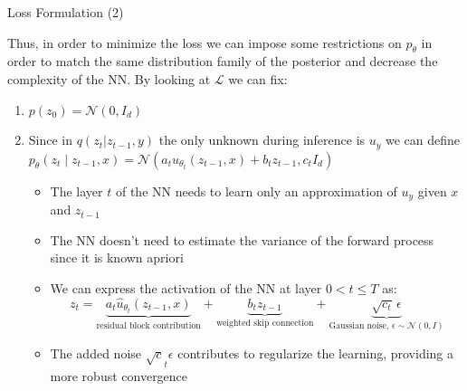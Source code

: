 \documentclass{beamer}
\begin{document}
\begin{frame}{Loss Formulation (2)}

Thus, in order to minimize the loss we can impose some restrictions on $p_\theta$ in order to match the same distribution family of the posterior and decrease the complexity of the NN. By looking at $\mathcal{L}$ we can fix:

\begin{enumerate}

\item $p(z_0) = \mathcal{N}(0, I_d)$
\item Since in $q(z_t | z_{t-1}, y)$ the only unknown during inference is $u_y$ we can define $p_\theta(z_t\mid z_{t-1}, x) = \mathcal{N}(a_t\hat u_{\theta _t}(z_{t-1}, x) + b_tz_{t-1} , c_tI_d)$

\medskip


\begin{itemize}

        \item The layer $t$ of the NN needs to learn only an approximation of $u_y$ given $x$ and $z_{t-1}$
        \item The NN doesn't need to estimate the variance of the forward process since it is known apriori
        \item We can express the activation of the NN at layer $0 < t \le T$ as:
        \[
        z_t = 
        \underbrace{a_t \hat u_{\theta _t}(z_{t-1}, x)}_{\text{residual block contribution}} +
        \underbrace{b_t z_{t-1}}_{\text{weighted skip connection}} +
        \underbrace{\sqrt{c_t}\,\epsilon}_{\text{Gaussian noise, }\epsilon \sim \mathcal{N}(0,I)}
    \]
        \item The added noise $\sqrt c_t \epsilon$ contributes to regularize the learning, providing a more robust convergence

\end{itemize}

\end{enumerate}
\end{frame}
\end{document}
